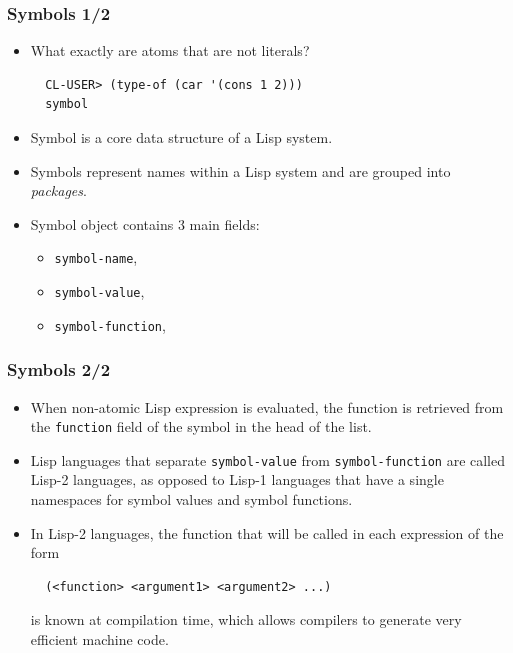 \documentclass{beamer}
\begin{document}
\begin{frame}[fragile]
  \frametitle{Symbols 1/2}
  \begin{itemize}
  \item What exactly are atoms that are not literals?
\begin{verbatim}
  CL-USER> (type-of (car '(cons 1 2)))
  symbol
\end{verbatim}
  \item Symbol is a core data structure of a Lisp system.
  \item Symbols represent names within a Lisp system and are grouped into
    \textit{packages}.
  \item Symbol object contains 3 main fields:
    \begin{itemize}
    \item \texttt{symbol-name},
    \item \texttt{symbol-value},
    \item \texttt{symbol-function},
    \end{itemize}
  \end{itemize}
\end{frame}

\begin{frame}[fragile]
  \frametitle{Symbols 2/2}
  \begin{itemize}
  \item When non-atomic Lisp expression is evaluated, the function is retrieved
    from the \texttt{function} field of the symbol in the head of the
    list.
  \item Lisp languages that separate \texttt{symbol-value} from
    \texttt{symbol-function} are called Lisp-2 languages, as opposed
    to Lisp-1 languages that have a single namespaces for symbol values and
    symbol functions.
  \item In Lisp-2 languages, the function that will be called in each
    expression of the form
\begin{verbatim}
  (<function> <argument1> <argument2> ...)
\end{verbatim}
    is known at compilation time, which allows compilers to generate very
    efficient machine code.
  \end{itemize}
\end{frame}
\end{document}

